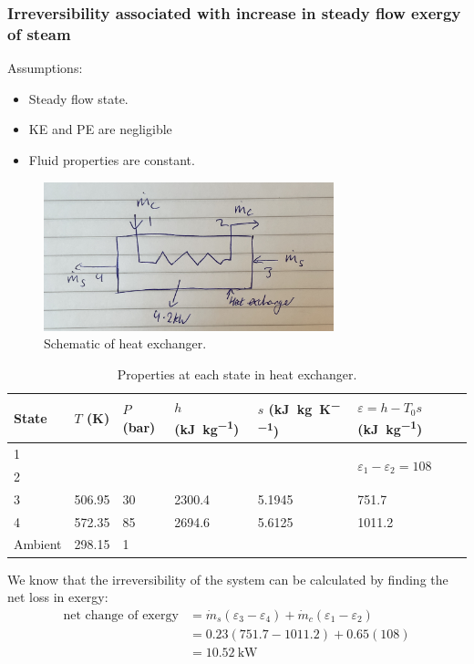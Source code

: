 \documentclass[11pt]{article}
\numberwithin{equation}{section}
\begin{document}
\subsubsection{Irreversibility associated with increase in steady flow exergy of steam}
Assumptions:
\begin{itemize}
    \item Steady flow state.
    \item KE and PE are negligible
    \item Fluid properties are constant.
\end{itemize}
\begin{figure}[H]
    \centering
    \includegraphics[width = 0.75\textwidth]{img/q2a.JPG}
    \caption{Schematic of heat exchanger.}
\end{figure}
\begin{table}[H]
    \centering
    \begin{tabular}{@{}llllll@{}}
    \toprule
        State & $T$ (\si{\kelvin}) & $P$ (\si{\bar}) & $h$ (\si{\kilo\joule\per\kg})& $s$ (\si{\kilo\joule\per\kg\per\kelvin}) & $\varepsilon = h - T_0 s$ (\si{\kilo\joule\per\kg})\\
        \midrule
        1 & & & & &\multirow{2}{*}{$\varepsilon_1 - \varepsilon_2 = 108$}\\
        2 & & & & &\\
        3 & 506.95 & 30 & 2300.4 & 5.1945 & 751.7\\
        4 & 572.35 & 85 & 2694.6 & 5.6125 & 1011.2\\
        Ambient & 298.15 & 1 & & & \\
        \bottomrule
    \end{tabular}
    \caption{Properties at each state in heat exchanger.}
\end{table}
We know that the irreversibility of the system can be calculated by finding the net loss in exergy:
\begin{align}
    \textrm{net change of exergy} &= \dot{m}_s\left(\varepsilon_3 - \varepsilon_4 \right) + \dot{m}_c \left(\varepsilon_1 - \varepsilon_2\right)\\
    &= 0.23\left(751.7 - 1011.2\right)+ 0.65(108)\\
    &= \SI{10.52}{\kilo\watt}
\end{align}
\end{document}
